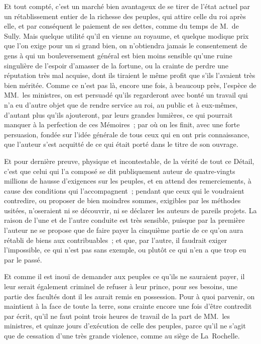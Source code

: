 \documentclass[french,twoside]{book} %
\begin{document}
Et tout compté, c’est un marché bien avantageux de se tirer de l’état actuel par un rétablissement entier de la richesse des peuples, qui attire celle du roi après elle, et par conséquent le paiement de ses dettes, comme du temps de M. de Sully. Mais quelque utilité qu’il en vienne au royaume, et quelque modique prix que l’on exige pour un si grand bien, on n’obtiendra jamais le consentement de gens à qui un bouleversement général est bien moins sensible qu’une ruine singulière de l’espoir d’amasser de la fortune, ou la crainte de perdre une réputation très mal acquise, dont ils tiraient le même profit que s’ils l’avaient très bien méritée. Comme ce n’est pas là, encore une fois, à beaucoup près, l’espèce de MM. les ministres, on est persuadé qu’ils regarderont avec bonté un travail qui n’a eu d’autre objet que de rendre service au roi, au public et à eux-mêmes, d’autant plus qu’ils ajouteront, par leurs grandes lumières, ce qui pourrait manquer à la perfection de ces Mémoires ; par où on les finit, avec une forte persuasion, fondée sur l’idée générale de tous ceux qui en ont pris connaissance, que l’auteur s’est acquitté de ce qui était porté dans le titre de son ouvrage.\par
Et pour dernière preuve, physique et incontestable, de la vérité de tout ce Détail, c’est que celui qui l’a composé se dit publiquement auteur de quatre-vingts millions de hausse d’exigences sur les peuples, et en attend des remerciements, à cause des conditions qui l’accompagnent ; pendant que ceux qui le voudraient contredire, ou proposer de bien moindres sommes, exigibles par les méthodes usitées, n’oseraient ni se découvrir, ni se déclarer les auteurs de pareils projets. La raison de l’une et de l’autre conduite est très sensible, puisque par la première l’auteur ne se propose que de faire payer la cinquième partie de ce qu’on aura rétabli de biens aux contribuables ; et que, par l’autre, il faudrait exiger l’impossible, ce qui n’est pas sans exemple, ou plutôt ce qui n’en a que trop eu par le passé.\par
Et comme il est inouï de demander aux peuples ce qu’ils ne sauraient payer, il leur serait également criminel de refuser à leur prince, pour ses besoins, une partie des facultés dont il les aurait remis en possession. Pour à quoi parvenir, on maintient à la face de toute la terre, sons crainte encore une fois d’être contredit par écrit, qu’il ne faut point trois heures de travail de la part de MM. les ministres, et quinze jours d’exécution de celle des peuples, parce qu’il ne s’agit que de cessation d’une très grande violence, comme au siège de La Rochelle.\par
\end{document}

